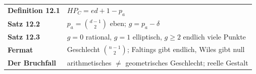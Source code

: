 \begin{merksatz}
\begin{center}
\renewcommand{\arraystretch}{1.5}
\begin{tabular}{@{}P{3.0cm}P{5.6cm}@{}}
\toprule
\textbf{Definition 12.1} & $HP_C = ed + 1 - p_a$\\
\textbf{Satz 12.2} & $p_a = \binom{d-1}{2}$ eben; $g = p_a - \delta$\\
\textbf{Satz 12.3} & $g = 0$ rational, $g = 1$ elliptisch, $g\ge2$ endlich viele Punkte\\
\textbf{Fermat} & Geschlecht $\binom{n-1}{2}$; Faltings gibt endlich, Wiles gibt null\\
\textbf{Der Bruchfall} & arithmetisches $\ne$ geometrisches Geschlecht; reelle Gestalt\\
\bottomrule
\end{tabular}
\end{center}

\begin{center}
\begin{minipage}{0.88\textwidth}
\end{minipage}
\end{center}
\end{merksatz}
